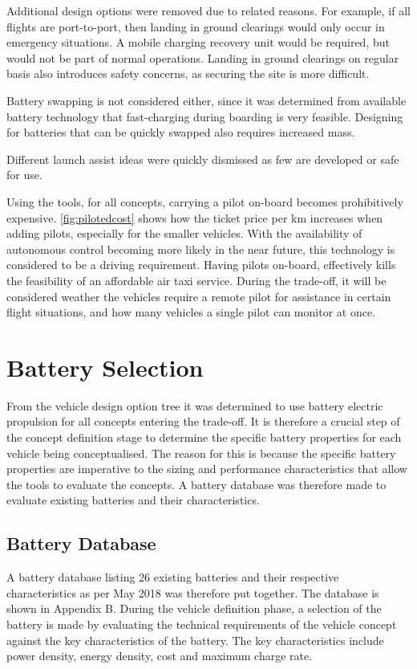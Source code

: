 Additional design options were removed due to related reasons. For example, if all flights are port-to-port, then landing in ground clearings would only occur in emergency situations. A mobile charging recovery unit would be required, but would not be part of normal operations. Landing in ground clearings on regular basis also introduces safety concerns, as securing the site is more difficult.

Battery swapping is not considered either, since it was determined from available battery technology that fast-charging during boarding is very feasible. Designing for batteries that can be quickly swapped also requires increased mass.

Different launch assist ideas were quickly dismissed as few are developed or safe for use.

Using the tools, for all concepts, carrying a pilot on-board becomes prohibitively expensive. \autoref{fig:pilotedcost} shows how the ticket price per km increases when adding pilots, especially for the smaller vehicles. With the availability of autonomous control becoming more likely in the near future, this technology is considered to be a driving requirement. Having pilots on-board, effectively kills the feasibility of an affordable air taxi service. During the trade-off, it will be considered weather the vehicles require a remote pilot for assistance in certain flight situations, and how many vehicles a single pilot can monitor at once.



\section{Battery Selection}
 From the vehicle design option tree it was determined to use battery electric propulsion for all concepts entering the trade-off. It is therefore a crucial step of the concept definition stage to determine the specific battery properties for each vehicle being conceptualised. The reason for this is because the specific battery properties are imperative to the sizing and performance characteristics that allow the tools to evaluate the concepts. A battery database was therefore made to evaluate existing batteries and their characteristics.

 \subsection{Battery Database}
 A battery database listing 26 existing batteries and their respective characteristics as per May 2018 was therefore put together. The database is shown in Appendix B. During the vehicle definition phase, a selection of the battery is made by evaluating the technical requirements of the vehicle concept against the key characteristics of the battery. The key characteristics include power density, energy density, cost and maximum charge rate. 
